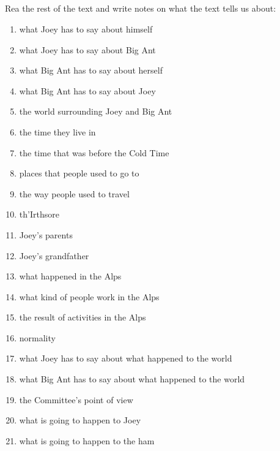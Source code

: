 \documentclass[10pt,a4paper,table]{article}
\begin{document}
\subsection{}
Rea the rest of the text and write notes on what the text tells us about:
  \begin{enumerate}[label=\textbf{\alph*.}, leftmargin=1.5em]
    \item what Joey has to say about himself
    \item what Joey has to say about Big Ant
    \item what Big Ant has to say about herself
    \item what Big Ant has to say about Joey
    \item the world surrounding Joey and Big Ant
    \item the time they live in
    \item the time that was before the Cold Time
    \item places that people used to go to
    \item the way people used to travel
    \item th’Irthsore
    \item Joey’s parents
    \item Joey’s grandfather
    \item what happened in the Alps
    \item what kind of people work in the Alps
    \item the result of activities in the Alps
    \item normality
    \item what Joey has to say about what happened to the world
    \item what Big Ant has to say about what happened to the world
    \item the Committee’s point of view
    \item what is going to happen to Joey
    \item what is going to happen to the ham
  \end{enumerate}

\clearpage
\end{document}
